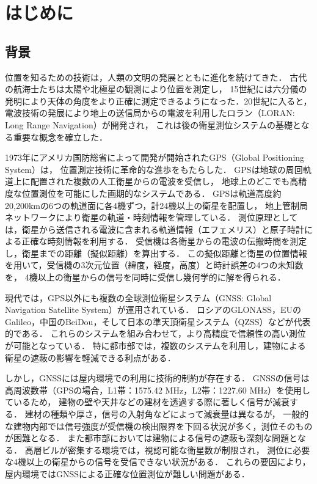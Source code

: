 \chapter{はじめに}
\thispagestyle{myheadings}


\section{背景}

位置を知るための技術は，人類の文明の発展とともに進化を続けてきた．
古代の航海士たちは太陽や北極星の観測により位置を測定し，
15世紀には六分儀の発明により天体の角度をより正確に測定できるようになった．20世紀に入ると，
電波技術の発展により地上の送信局からの電波を利用したロラン（LORAN: Long Range Navigation）が開発され，
これは後の衛星測位システムの基礎となる重要な概念を確立した．

1973年にアメリカ国防総省によって開発が開始されたGPS（Global Positioning System）は，
位置測定技術に革命的な進歩をもたらした．
GPSは地球の周回軌道上に配置された複数の人工衛星からの電波を受信し，
地球上のどこでも高精度な位置測位を可能にした画期的なシステムである．
GPSは軌道高度約20,200kmの6つの軌道面に各4機ずつ，計24機以上の衛星を配置し，
地上管制局ネットワークにより衛星の軌道・時刻情報を管理している．
測位原理としては，衛星から送信される電波に含まれる軌道情報（エフェメリス）と原子時計による正確な時刻情報を利用する．
受信機は各衛星からの電波の伝搬時間を測定し，衛星までの距離（擬似距離）を算出する．
この擬似距離と衛星の位置情報を用いて，受信機の3次元位置（緯度，経度，高度）と時計誤差の4つの未知数を，
4機以上の衛星からの信号を同時に受信し幾何学的に解を得られる．

現代では，GPS以外にも複数の全球測位衛星システム（GNSS: Global Navigation Satellite System）が運用されている．
ロシアのGLONASS，EUのGalileo，中国のBeiDou，そして日本の準天頂衛星システム（QZSS）などが代表的である．
これらのシステムを組み合わせて，より高精度で信頼性の高い測位が可能となっている．
特に都市部では，複数のシステムを利用し，建物による衛星の遮蔽の影響を軽減できる利点がある．

しかし，GNSSには屋内環境での利用に技術的制約が存在する．
GNSSの信号は高周波数帯（GPSの場合，L1帯：1575.42 MHz，L2帯：1227.60 MHz）を使用しているため，
建物の壁や天井などの建材を透過する際に著しく信号が減衰する．
建材の種類や厚さ，信号の入射角などによって減衰量は異なるが，
一般的な建物内部では信号強度が受信機の検出限界を下回る状況が多く，測位そのものが困難となる．
また都市部においては建物による信号の遮蔽も深刻な問題となる．
高層ビルが密集する環境では，視認可能な衛星数が制限され，
測位に必要な4機以上の衛星からの信号を受信できない状況がある．
これらの要因により，屋内環境ではGNSSによる正確な位置測位が難しい問題がある．

